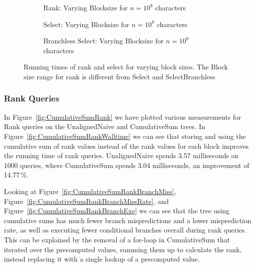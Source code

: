 \begin{figure}\tiny
\begin{subfigure}{0.45\textwidth}
	
	\caption{Rank: Varying Blocksize for $n=10^8$ characters}
	\label{fig:CumulativeSumBlockSizeWallTimeRank}
\end{subfigure}
\hfill
\begin{subfigure}{0.45\textwidth}
	
	\caption{Select: Varying Blocksize for $n=10^8$ characters}
	\label{fig:CumulativeSumBlockSizeWallTimeSelect}
\end{subfigure}

\begin{subfigure}{0.45\textwidth}
	
	\caption{Branchless Select: Varying Blocksize for $n=10^8$ characters}
	\label{fig:CumulativeSumBlockSizeWallTimeSelectBranchless}
\end{subfigure}

\caption{Running times of rank and select for varying block sizes. The Block size range for rank is different from Select and SelectBranchless}
\label{fig:CumulativeSumBlockSize}
\end{figure}

\restoregeometry

\subsubsection{Rank Queries}
In Figure~\ref{fig:CumulativeSumRank} we have plotted various measurements for Rank queries on the UnalignedNaive and CumulativeSum trees.
In Figure~\ref{fig:CumulativeSumRankWalltime} we can see that storing and using the cumulative sum of rank values instead of the rank values for each block improves the running time of rank queries.
UnalignedNaive spends 3.57 milliseconds on 1000 queries, where CumulativeSum spends 3.04 milliseconds, an improvement of 14.77\,\%.

Looking at Figure~\ref{fig:CumulativeSumRankBranchMiss}, Figure~\ref{fig:CumulativeSumRankBranchMissRate}, and Figure~\ref{fig:CumulativeSumRankBranchExe} we can see that the tree using cumulative sums has much fewer branch mispredictions and a lower misprediction rate, as well as executing fewer conditional branches overall during rank queries.
This can be explained by the removal of a for-loop in CumulativeSum that iterated over the precomputed values, summing them up to calculate the rank, instead replacing it with a single lookup of a precomputed value.

